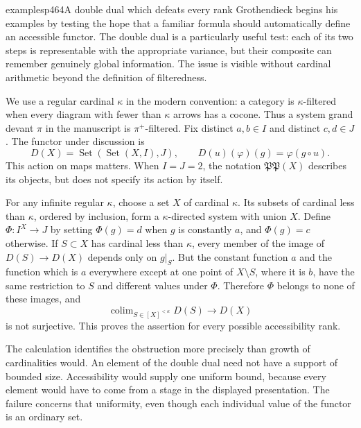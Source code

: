 \begin{dcomment}{examples}{p464}{A double dual which defeats every rank}
Grothendieck begins his examples by testing the hope that a familiar formula should automatically define an accessible functor. The double dual is a particularly useful test: each of its two steps is representable with the appropriate variance, but their composite can remember genuinely global information. The issue is visible without cardinal arithmetic beyond the definition of filteredness.

We use a regular cardinal $\kappa$ in the modern convention: a category is $\kappa$-filtered when every diagram with fewer than $\kappa$ arrows has a cocone. Thus a system grand devant $\pi$ in the manuscript is $\pi^+$-filtered. Fix distinct $a,b\in I$ and distinct $c,d\in J$. The functor under discussion is
\[
 D(X)=\operatorname{Set}(\operatorname{Set}(X,I),J),\qquad
 D(u)(\varphi)(g)=\varphi(g\circ u).
\]
This action on maps matters. When $I=J=2$, the notation $\mathfrak P\mathfrak P(X)$ describes its objects, but does not specify its action by itself.

For any infinite regular $\kappa$, choose a set $X$ of cardinal $\kappa$. Its subsets of cardinal less than $\kappa$, ordered by inclusion, form a $\kappa$-directed system with union $X$. Define $\Phi:I^X\to J$ by setting $\Phi(g)=d$ when $g$ is constantly $a$, and $\Phi(g)=c$ otherwise. If $S\subset X$ has cardinal less than $\kappa$, every member of the image of $D(S)\to D(X)$ depends only on $g|_S$. But the constant function $a$ and the function which is $a$ everywhere except at one point of $X\setminus S$, where it is $b$, have the same restriction to $S$ and different values under $\Phi$. Therefore $\Phi$ belongs to none of these images, and
\[
 \operatorname{colim}_{S\in[X]^{<\kappa}}D(S)\longrightarrow D(X)
\]
is not surjective. This proves the assertion for every possible accessibility rank.

The calculation identifies the obstruction more precisely than growth of cardinalities would. An element of the double dual need not have a support of bounded size. Accessibility would supply one uniform bound, because every element would have to come from a stage in the displayed presentation. The failure concerns that uniformity, even though each individual value of the functor is an ordinary set.
\end{dcomment}

